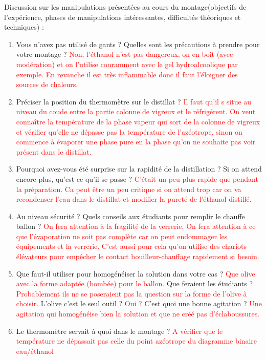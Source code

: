 \begin{reportBlock}{Discussion sur les manipulations présentées au cours du montage(objectifs de l’expérience, phases de manipulations intéressantes, difficultés théoriques et techniques) :}
 \begin{enumerate}
      \item	Vous n'avez pas utilisé de gants ? Quelles sont les précautions à prendre pour votre montage ? \textcolor{red}{Non, l'éthanol n'est pas dangereux, on en boit (avec modération) et on l'utilise couramment avec le gel hydroalcoolique par exemple. En revanche il est très inflammable donc il faut l'éloigner des sources de chaleurs.}
      \item Préciser la position du thermomètre sur le distillat ? \textcolor{red}{Il faut qu'il s situe au niveau du coude entre la partie colonne de vigreux et le réfrigérent. On veut connaître la température de la phase vapeur qui sort de la colonne de vigreux et vérifier qu'elle ne dépasse pas la température de l'azéotrope, sinon on commence à évaporer une phase pure en la phase qu'on ne souhaite pas voir présent dans le distillat.}
      \item Pourquoi avez-vous été surprise sur la rapidité de la distillation ? Si on attend encore plus, qu’est-ce qu’il se passe ? \textcolor{red}{C'était un peu plus rapide que pendant la préparation. Ca peut être un peu critique si on attend trop car on va recondenser l'eau dans le distillat et modifier la pureté de l'éthanol distillé.}
      \item Au niveau sécurité ? Quels conseils aux étudiants pour remplir le chauffe ballon ? \textcolor{red}{On fera attention à la fragilité de la verrerie. On fera attention à ce que l'évaporation ne soit pas complète car on peut endommager les équipements et la verrerie. C'est aussi pour cela qu'on utilise des chariots élévateurs pour empêcher le contact bouilleur-chauffage rapidement si besoin.}
      \item Que faut-il utiliser pour homogénéiser la solution dans votre cas ? \textcolor{red}{Que olive avec la forme adaptée (bombée) pour le ballon.} Que feraient les étudiants ? \textcolor{red}{Probablement ils ne se poseraient pas la question sur la forme de l'olive à choisir.} L’olive c’est le seul outil ? \textcolor{red}{Oui ?} C’est quoi une bonne agitation ? \textcolor{red}{Une agitation qui homogénéise bien la solution et que ne créé pas d'éclaboussures.}
      \item Le thermomètre servait à quoi dans le montage ? \textcolor{red}{A vérifier que le température ne dépassait pas celle du point azéotrope du diagramme binaire eau/éthanol}

\end{enumerate}
\end{reportBlock}
